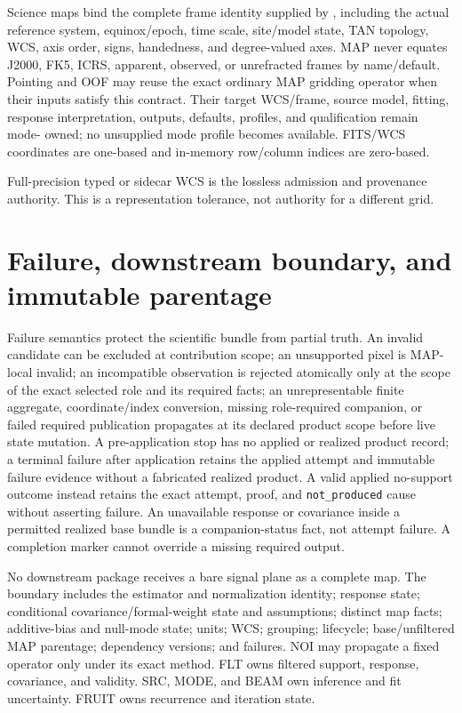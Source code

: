 \documentclass[10pt]{article}
\begin{document}
Science maps bind the complete frame identity supplied by
\SCIMapASTRTCGridProfile, including the actual reference
system, equinox/epoch, time scale, site/model state, TAN topology, WCS, axis
order, signs, handedness, and degree-valued axes. MAP never equates J2000,
FK5, ICRS, apparent, observed, or unrefracted frames by name/default. Pointing
and OOF may reuse the exact ordinary MAP gridding operator when their inputs
satisfy this contract. Their target WCS/frame, source model, fitting, response
interpretation, outputs, defaults, profiles, and qualification remain mode-
owned; no unsupplied mode profile becomes available. FITS/WCS coordinates are
one-based and in-memory row/column indices are zero-based.

Full-precision typed or sidecar WCS is the lossless admission and provenance
authority. \SCIMapWCSComparisonDefinition{} This is a representation tolerance,
not authority for a different grid.

\SCIMapLifecycleDefinition

\SCIMapLifecycleTable

\SCIMapAxisSeparationDefinition

\SCIMapLifecycleAssumption

\clearpage
\section{Failure, downstream boundary, and immutable parentage}

Failure semantics protect the scientific bundle from partial truth. An
invalid candidate can be excluded at contribution scope; an unsupported pixel
is MAP-local invalid; an incompatible observation is rejected atomically only
at the scope of the exact selected role and its required facts; an
unrepresentable finite aggregate, coordinate/index conversion, missing
role-required companion, or failed required publication propagates at its
declared product scope before live state mutation. A pre-application stop has
no applied or realized product record; a terminal failure after application
retains the applied attempt and immutable failure evidence without a fabricated
realized product. A valid applied no-support outcome instead retains the exact
attempt, proof, and \texttt{not\_produced} cause without asserting failure.
An unavailable response or covariance inside a permitted realized base bundle
is a companion-status fact, not attempt failure. A completion marker
cannot override a missing required output.

No downstream package receives a bare signal plane as a complete map. The
boundary includes the estimator and normalization identity; response state;
conditional covariance/formal-weight state and assumptions; distinct map facts;
additive-bias and null-mode state; units; WCS; grouping; lifecycle;
base/unfiltered MAP parentage; dependency versions; and failures.
\SCIMapNOIOwnershipStatement{} NOI may propagate a fixed
operator only under its exact method. FLT
owns filtered support, response, covariance, and validity. SRC, MODE, and BEAM
own inference and fit uncertainty. FRUIT owns recurrence and iteration state.
\end{document}
